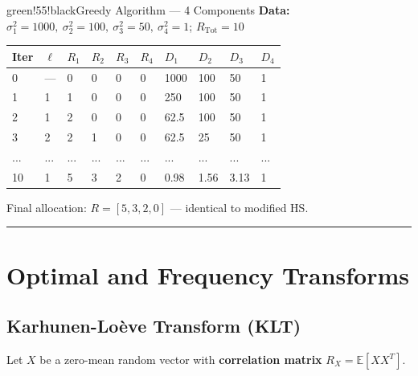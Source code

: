 \begin{calloutbox}{green!55!black}{Greedy Algorithm — 4 Components}
\textbf{Data:} $\sigma_1^2=1000,\ \sigma_2^2=100,\ \sigma_3^2=50,\ \sigma_4^2=1$; $R_{\text{Tot}}=10$

\begin{center}
\begin{tabular}{|l|l|l|l|l|l|l|l|l|l|}
\hline
\textbf{Iter} & \textbf{$\ell$} & \textbf{$R_1$} & \textbf{$R_2$} & \textbf{$R_3$} & \textbf{$R_4$} & \textbf{$D_1$} & \textbf{$D_2$} & \textbf{$D_3$} & \textbf{$D_4$} \\ \hline
0 & — & 0 & 0 & 0 & 0 & 1000 & 100 & 50 & 1 \\ \hline
1 & 1 & 1 & 0 & 0 & 0 & 250 & 100 & 50 & 1 \\ \hline
2 & 1 & 2 & 0 & 0 & 0 & 62.5 & 100 & 50 & 1 \\ \hline
3 & 2 & 2 & 1 & 0 & 0 & 62.5 & 25 & 50 & 1 \\ \hline
... & ... & ... & ... & ... & ... & ... & ... & ... & ... \\ \hline
10 & 1 & 5 & 3 & 2 & 0 & 0.98 & 1.56 & 3.13 & 1 \\ \hline
\end{tabular}
\end{center}

Final allocation: $R = [5,3,2,0]$ — identical to modified HS.
\end{calloutbox}

\bigskip\hrule\bigskip

\section{Optimal and Frequency Transforms}

\subsection{Karhunen-Loève Transform (KLT)}

Let $X$ be a zero-mean random vector with \textbf{correlation matrix} $R_X = \mathbb{E}[XX^T]$.

